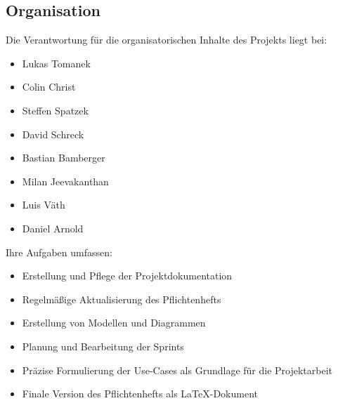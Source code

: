 \documentclass[%
	12pt,
	a4paper,
	oneside,
	parskip=full
]{scrbook}
\begin{document}
\subsection{Organisation}
Die Verantwortung für die organisatorischen Inhalte des Projekts liegt bei:
\begin{itemize}
	\item Lukas Tomanek
	\item Colin Christ
	\item Steffen Spatzek
	\item David Schreck
	\item Bastian Bamberger
	\item Milan Jeevakanthan
	\item Luis Väth
	\item Daniel Arnold
\end{itemize}
Ihre Aufgaben umfassen:
\begin{itemize}
	\item Erstellung und Pflege der Projektdokumentation
	\item Regelmäßige Aktualisierung des Pflichtenhefts
	\item Erstellung von Modellen und Diagrammen
	\item Planung und Bearbeitung der Sprints
	\item Präzise Formulierung der Use-Cases als Grundlage für die Projektarbeit
	\item Finale Version des Pflichtenhefts als \LaTeX-Dokument
\end{itemize}
\end{document}
